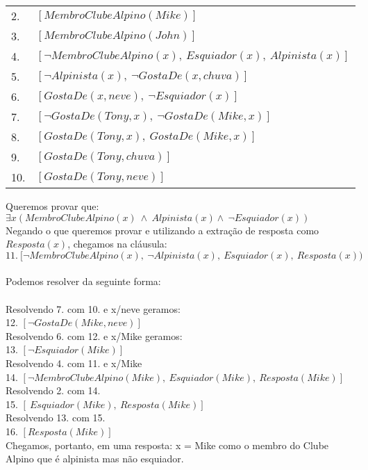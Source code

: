 \documentclass[12pt]{article}
\begin{document}
\begin{itemize}
\begin{itemize}
\begin{center}
\begin{tabular}{ll}
						2. & $[MembroClubeAlpino(Mike)]$\\
						3. & $[MembroClubeAlpino(John)]$\\
						4. & $[\neg MembroClubeAlpino(x), \ Esquiador(x), \ Alpinista(x)] $ \\
						5. & $[\neg Alpinista(x), \ \neg GostaDe(x, chuva)] $\\
						6. & $[GostaDe(x, neve), \  \neg Esquiador(x)]$\\
						7. & $[\neg GostaDe(Tony, x), \  \neg GostaDe(Mike, x)]$\\
						8. & $[GostaDe(Tony, x), \  GostaDe(Mike, x)]$\\
						9. & $[GostaDe(Tony, chuva)]$\\
						10. & $[GostaDe(Tony, neve)]$\\			
					\end{tabular}
				\end{center}
				Queremos provar que:\\
				$\exists x (MembroClubeAlpino(x) \ \wedge \ Alpinista(x) \wedge \  
				\neg Esquiador(x))$\\
				
				Negando o que queremos provar e utilizando a extração de resposta como 
				$Resposta(x)$, chegamos na cláusula:\\
				$11. \ [\neg MembroClubeAlpino(x), \  \neg Alpinista(x),  \ Esquiador(x),
				\ Resposta(x))$\\ \\
			Podemos resolver da seguinte forma:\\ \\
			 Resolvendo 7. com 10. e x/neve geramos:\\
			12. $[\neg GostaDe(Mike, neve)]$\\
	
			Resolvendo 6. com 12. e x/Mike geramos:\\
			13. $[\neg Esquiador(Mike)]$\\
			
			Resolvendo 4. com 11. e x/Mike\\
			14. $ [\neg MembroClubeAlpino(Mike),  \ Esquiador(Mike), \ Resposta(Mike)]$\\
			
			Resolvendo 2. com 14.\\
			15. $ [\ Esquiador(Mike), \ Resposta(Mike)]$\\
			
			Resolvendo 13. com 15.\\
			16. $ [Resposta(Mike)]$\\

			Chegamos, portanto, em uma resposta: x = Mike como o
			membro do Clube Alpino que é alpinista mas não esquiador.
			\end{itemize}
	\end{itemize}
\end{document}
